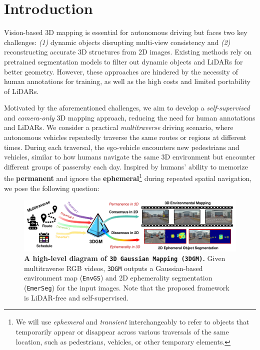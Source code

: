 \section{Introduction}
\label{sec:intro}
Vision-based 3D mapping is essential for autonomous driving but faces two key challenges: \emph{(1)} dynamic objects disrupting multi-view consistency and \emph{(2)} reconstructing accurate 3D structures from 2D images. Existing methods rely on pretrained segmentation models to filter out dynamic objects and LiDARs for better geometry. However, these approaches are hindered by the necessity of human annotations for training, as well as the high costs and limited portability of LiDARs.


Motivated by the aforementioned challenges, we aim to develop a \textit{self-supervised} and \textit{camera-only} 3D mapping approach, reducing the need for human annotations and LiDARs. We consider a practical \textit{multitraverse} driving scenario, where autonomous vehicles repeatedly traverse the same routes or regions at different times. During each traversal, the ego-vehicle encounters new pedestrians and vehicles, similar to how humans navigate the same 3D environment but encounter different groups of passersby each day. Inspired by humans' ability to memorize the \textbf{permanent} and ignore the \textbf{ephemeral}\footnote{We will use \textit{ephemeral} and \textit{transient} interchangeably to refer to objects that temporarily appear or disappear across various traversals of the same location, such as pedestrians, vehicles, or other temporary elements.} during repeated spatial navigation, we pose the following question:
\begin{figure}[t]
\begin{center}
\centerline{\includegraphics[width=\columnwidth]{figs_compressed/teaser_compressed.pdf}}
\caption{\textbf{A high-level diagram of \texttt{3D Gaussian Mapping (3DGM)}.} Given multitraverse RGB videos, \texttt{3DGM} outputs a Gaussian-based environment map (\texttt{EnvGS}) and 2D ephemerality segmentation (\texttt{EmerSeg}) for the input images. Note that the proposed framework is LiDAR-free and self-supervised. }
\label{fig:teaser}
\end{center}
\vspace{-7mm}
\end{figure}

